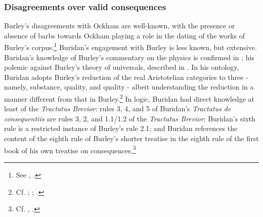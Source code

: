 \documentclass[]{article}
\begin{document}
\subsubsection{Disagreements over valid consequences}
Burley's disagreements with Ockham are well-known, with the presence or absence of barbs towards Ockham playing a role in the dating of the works of Burley's corpus.\footnote{See \cite{Ottman1999}, \cite{Vittorini2013}.} Buridan's engagement with Burley is less known, but extensive. Buridan's knowledge of Burley's commentary on the physics is confirmed in \cite[p. 439]{Michael1985b}; his polemic against Burley's theory of universals, described in \cite{Markowski1982}. In his ontology, Buridan adopts Burley's reduction of the real Aristotelian categories to three - namely, substance, quality, and quality - albeit understanding the reduction in a manner different from that in Burley.\footnote{Cf. \cite[pp. 57-59, 204, 269-270]{Klima2009}; \cite[p. 13]{Read2016b}; \cite{DutilhNovaes2013}.} In logic, Buridan had direct knowledge at least of the \textit{Tractatus Brevior}: rules 3, 4, and 5 of Buridan's \textit{Tractatus de consequentiis} are rules 3, 2, and 1.1/1.2 of the \textit{Tractatus Brevior}; Buridan's sixth rule is a restricted instance of Burley's rule 2.1; and Buridan references the content of the eighth rule of Burley's shorter treatise in the eighth rule of the first book of his own treatise on consequences.\footnote{Cf. \cite[p. 212.29-31]{BurleyDPAL}, \cite[I. 8]{BuridanTC}.}
\end{document}
